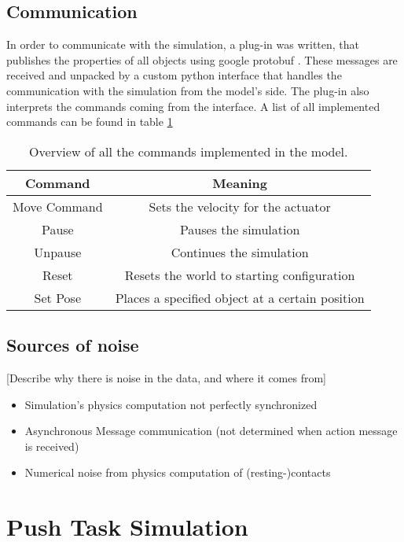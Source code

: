 \subsection{Communication}
In order to communicate with the simulation, a plug-in was written, that publishes the properties of all objects using google protobuf \cite{protobuf}. These messages are received and unpacked by a custom python interface that handles the communication with the simulation from the model's side. The plug-in also interprets the commands coming from the interface. A list of all implemented commands can be found in table \ref{tab:commands}

\begin{table}
	\centering
	\begin{tabular}{|c|c|}
		\hline \textbf{Command} & \textbf{Meaning} \\ 
		\hline Move Command & Sets the velocity for the actuator \\ 
		\hline Pause & Pauses the simulation \\
		\hline Unpause & Continues the simulation \\
		\hline Reset & Resets the world to starting configuration \\
		\hline Set Pose & Places a specified object at a certain position \\
		\hline
	\end{tabular} 
	\caption{Overview of all the commands implemented in the model.}
	\label{tab:commands}
\end{table}

\subsection{Sources of noise}
[Describe why there is noise in the data, and where it comes from]
\begin{itemize}
\item Simulation's physics computation not perfectly synchronized %
\item Asynchronous Message communication (not determined when action message is received)
\item Numerical noise from physics computation of (resting-)contacts
\end{itemize}

\section{Push Task Simulation}

